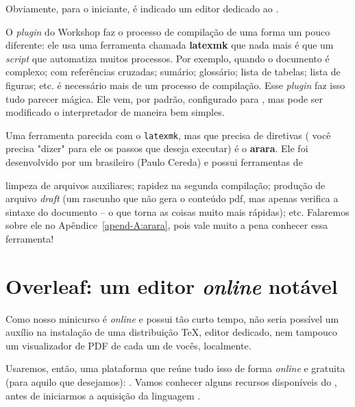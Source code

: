 Obviamente, para o iniciante, é indicado um editor dedicado ao .

O \textit{plugin}  do  Workshop faz o processo de compilação de uma
forma um pouco diferente: ele usa uma ferramenta chamada \textbf{latexmk} que 
nada mais é que um \textit{script} que automatiza muitos processos.
Por exemplo, quando o documento é complexo; com referências cruzadas; sumário; 
glossário; lista de tabelas; lista de figuras; etc. é necessário mais de um processo
de compilação. 
Esse \textit{plugin} faz isso tudo parecer mágica.
Ele vem, por padrão, configurado para \pdflatex, mas pode ser modificado
o interpretador de maneira bem simples.

Uma ferramenta parecida com o \texttt{latexmk}, mas que precisa de diretivas (
você precisa "dizer" para ele os passos que deseja executar) é o \textbf{arara}.
Ele foi desenvolvido por um brasileiro (Paulo Cereda) e possui ferramentas de 
limpeza de arquivos auxiliares; rapidez na segunda compilação; produção de arquivo 
\textit{draft} (um rascunho que não gera o conteúdo pdf, mas apenas verifica a 
sintaxe do documento -- o que torna as coisas muito mais rápidas); etc.
Falaremos sobre ele no Apêndice~\ref{apend-A:arara}, pois vale muito a pena 
conhecer essa ferramenta!

\section{Overleaf: um editor \textit{online} notável} %
\label{sec:overleaf}

Como nosso minicurso é \textit{online} e possui tão curto tempo, não seria 
possível um auxílio na instalação de uma distribuição \TeX{}, editor dedicado, 
nem tampouco um visualizador de PDF de cada um de vocês, localmente.

Usaremos, então, uma plataforma que reúne tudo isso de forma \textit{online} e 
gratuita (para aquilo que desejamos): \Overleaf.
Vamos conhecer alguns recursos disponíveis do \Overleaf, antes de iniciarmos a
aquisição da linguagem .

